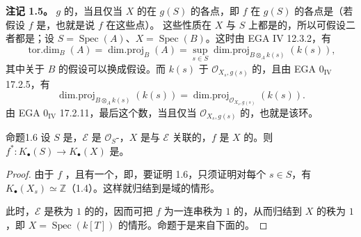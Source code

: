 \textbf{注记 1.5。} $g$ 的，当且仅当 $X$ 的在 $g(S)$ 的各点，即 $f$ 在 $g(S)$ 的各点是（若假设 $f$ 是，也就是说 $f$ 在这些点）。
这些性质在 $X$ 与 $S$ 上都是的，所以可假设二者都是；设 $S=\operatorname{Spec}(A)$、$X=\operatorname{Spec}(B)$。这时由 EGA IV 12.3.2，有
\[
\operatorname{tor.dim}_B(A)=\operatorname{dim.proj}_B(A)
=\sup_{s\in S}\operatorname{dim.proj}_{B\otimes_A k(s)}(k(s)),
\]
其中关于 $B$ 的假设可以换成假设。而 $k(s)$ 于 $\mathcal O_{X_s,g(s)}$ 的，且由 EGA $0_{\mathrm{IV}}$ 17.2.5，有
\[
\operatorname{dim.proj}_{B\otimes_A k(s)}(k(s))
=\operatorname{dim.proj}_{\mathcal O_{X_s,g(s)}}(k(s)).
\]
由 EGA $0_{\mathrm{IV}}$ 17.2.11，最后这个数，当且仅当 $\mathcal O_{X_s,g(s)}$ 的，也就是该环。

\begin{SGAresult}{命题}{1.6}
设 $S$ 是，$\mathcal E$ 是 $\mathcal O_S$-，$X$ 是与 $\mathcal E$ 关联的，$f$ 是 $X$ 的。则 $f^*:K_\bullet(S)\to K_\bullet(X)$ 是。
\end{SGAresult}
\begin{proof}
由于 $f$ ，且有一个，即，要证明 1.6，只须证明对每个 $s\in S$，有 $K_\bullet(X_s)\simeq\mathbb Z$（1.4）。这样就归结到是域的情形。

此时，$\mathcal E$ 是秩为 $1$ 的的，因而可把 $f$ 为一连串秩为 $1$ 的，从而归结到 $X$ 的秩为 $1$，即 $X=\operatorname{Spec}(k[T])$ 的情形。命题于是来自下面的。
\end{proof}

